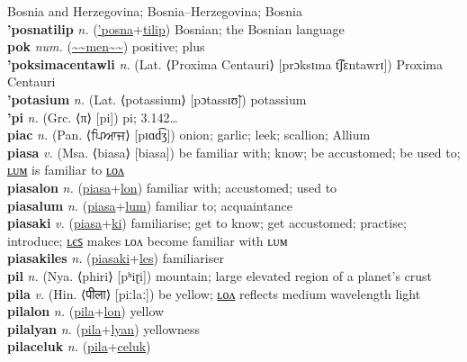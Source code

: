 Bosnia and Herzegovina; Bosnia–Herzegovina; Bosnia \label{'posnatec} \\
\textbf{'posnatilip} \textit{n.} (\hyperref['posna]{'posna}+\hyperref[tilip]{tilip})
Bosnian; the Bosnian language \label{'posnatilip} \\
\textbf{pok} \textit{num.} (\hyperref[men]{\~{}\~{}men\~{}\~{}})
positive; plus \label{pok} \\
\textbf{'poksimacentawli} \textit{n.} (Lat. ⟨Proxima Centauri⟩ [prɔksɪma t͡ʃɛntawrɪ])
Proxima Centauri \label{'poksimacentawli} \\
\textbf{'potasium} \textit{n.} (Lat. ⟨potassium⟩ [pɔtassɪʊ̃])
potassium \label{'potasium} \\
\textbf{'pi} \textit{n.} (Grc. ⟨π⟩ [pi])
pi; 3.142… \label{'pi} \\
\textbf{piac} \textit{n.} (Pan. ⟨ਪਿਆਜ⟩ [pɪɑd͡ʒ])
onion; garlic; leek; scallion; Allium \label{piac} \\
\textbf{piasa} \textit{v.} (Msa. ⟨biasa⟩ [biasa])
be familiar with; know; be accustomed; be used to; \hyperref[piasalum]{ʟᴜᴍ} is familiar to \hyperref[piasalon]{ʟᴏᴧ} \label{piasa} \\
\textbf{piasalon} \textit{n.} (\hyperref[piasa]{piasa}+\hyperref[lon]{lon})
familiar with; accustomed; used to \label{piasalon} \\
\textbf{piasalum} \textit{n.} (\hyperref[piasa]{piasa}+\hyperref[lum]{lum})
familiar to; acquaintance \label{piasalum} \\
\textbf{piasaki} \textit{v.} (\hyperref[piasa]{piasa}+\hyperref[ki]{ki})
familiarise; get to know; get accustomed; practise; introduce; \hyperref[piasakiles]{ʟєꜱ} makes ʟᴏᴧ become familiar with ʟᴜᴍ \label{piasaki} \\
\textbf{piasakiles} \textit{n.} (\hyperref[piasaki]{piasaki}+\hyperref[les]{les})
familiariser \label{piasakiles} \\
\textbf{pil} \textit{n.} (Nya. ⟨phiri⟩ [pʰiɽi])
mountain; large elevated region of a planet's crust \label{pil} \\
\textbf{pila} \textit{v.} (Hin. ⟨पीला⟩ [piːlaː])
be yellow; \hyperref[pilalon]{ʟᴏᴧ} reflects medium wavelength light \label{pila} \\
\textbf{pilalon} \textit{n.} (\hyperref[pila]{pila}+\hyperref[lon]{lon})
yellow \label{pilalon} \\
\textbf{pilalyan} \textit{n.} (\hyperref[pila]{pila}+\hyperref[lyan]{lyan})
yellowness \label{pilalyan} \\
\textbf{pilaceluk} \textit{n.} (\hyperref[pila]{pila}+\hyperref[celuk]{celuk})
